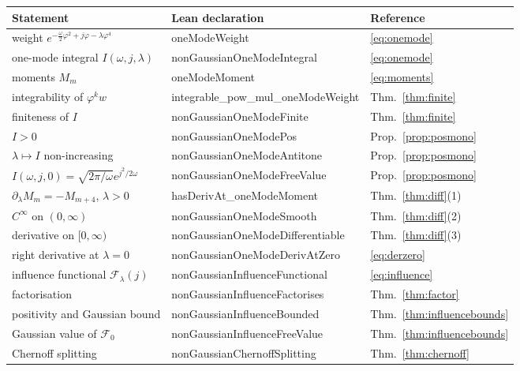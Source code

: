\documentclass[11pt,a4paper]{article}
\theoremstyle{plain}
\theoremstyle{definition}
\theoremstyle{remark}
\let\leanoldunderscore\_
\newcommand{\leanbreakunderscore}{\leanoldunderscore\allowbreak}
\newcommand{\lean}[1]{{\ttfamily\hyphenchar\font=-1\relax
  \let\_\leanbreakunderscore #1}}
\begin{document}
\begin{center}
\begin{tabular}{@{}lll@{}}
\toprule
Statement & Lean declaration & Reference\\
\midrule
weight $e^{-\frac\omega2\varphi^2+j\varphi-\lambda\varphi^4}$
 & \lean{oneModeWeight} & \eqref{eq:onemode}\\
one-mode integral $I(\omega,j,\lambda)$
 & \lean{nonGaussianOneModeIntegral} & \eqref{eq:onemode}\\
moments $M_m$
 & \lean{oneModeMoment} & \eqref{eq:moments}\\
integrability of $\varphi^{k}w$
 & \lean{integrable\_pow\_mul\_oneModeWeight} & Thm.~\ref{thm:finite}\\
finiteness of $I$
 & \lean{nonGaussianOneModeFinite} & Thm.~\ref{thm:finite}\\
$I>0$
 & \lean{nonGaussianOneModePos} & Prop.~\ref{prop:posmono}\\
$\lambda\mapsto I$ non-increasing
 & \lean{nonGaussianOneModeAntitone} & Prop.~\ref{prop:posmono}\\
$I(\omega,j,0)=\sqrt{2\pi/\omega}e^{j^2/2\omega}$
 & \lean{nonGaussianOneModeFreeValue} & Prop.~\ref{prop:posmono}\\
$\partial_\lambda M_m=-M_{m+4}$, $\lambda>0$
 & \lean{hasDerivAt\_oneModeMoment} & Thm.~\ref{thm:diff}(1)\\
$C^\infty$ on $(0,\infty)$
 & \lean{nonGaussianOneModeSmooth} & Thm.~\ref{thm:diff}(2)\\
derivative on $[0,\infty)$
 & \lean{nonGaussianOneModeDifferentiable} & Thm.~\ref{thm:diff}(3)\\
right derivative at $\lambda=0$
 & \lean{nonGaussianOneModeDerivAtZero} & \eqref{eq:derzero}\\
influence functional $\mathcal{F}_\lambda(j)$
 & \lean{nonGaussianInfluenceFunctional} & \eqref{eq:influence}\\
factorisation
 & \lean{nonGaussianInfluenceFactorises} & Thm.~\ref{thm:factor}\\
positivity and Gaussian bound
 & \lean{nonGaussianInfluenceBounded} & Thm.~\ref{thm:influencebounds}\\
Gaussian value of $\mathcal{F}_0$
 & \lean{nonGaussianInfluenceFreeValue} & Thm.~\ref{thm:influencebounds}\\
Chernoff splitting
 & \lean{nonGaussianChernoffSplitting} & Thm.~\ref{thm:chernoff}\\
\bottomrule
\end{tabular}
\end{center}
\end{document}
